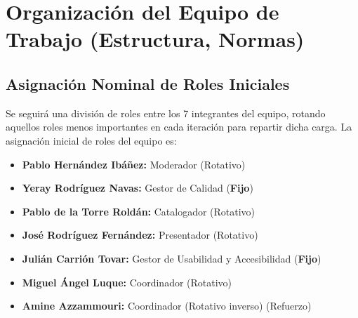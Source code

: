 \section{Organización del Equipo de Trabajo (Estructura, Normas)}

\subsection{Asignación Nominal de Roles Iniciales}
Se seguirá una división de roles entre los 7 integrantes del equipo, rotando aquellos roles menos importantes en cada iteración para repartir dicha carga. La asignación inicial de roles del equipo es:
\begin{itemize}[leftmargin=*]
  \item \textbf{Pablo Hernández Ibáñez:} Moderador (Rotativo)
  \item \textbf{Yeray Rodríguez Navas:} Gestor de Calidad (\textbf{Fijo})
  \item \textbf{Pablo de la Torre Roldán:} Catalogador (Rotativo)
  \item \textbf{José Rodríguez Fernández:} Presentador (Rotativo)
  \item \textbf{Julián Carrión Tovar:} Gestor de Usabilidad y Accesibilidad (\textbf{Fijo})
  \item \textbf{Miguel Ángel Luque:} Coordinador (Rotativo)
  \item \textbf{Amine Azzammouri: } Coordinador (Rotativo inverso) (Refuerzo)
\end{itemize}

